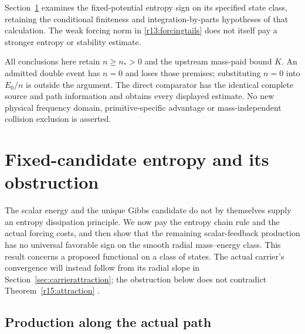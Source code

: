\documentclass[11pt]{article}
\numberwithin{equation}{section}
\begin{document}
Section~\ref{sec:entropyobstruction} examines the fixed-potential entropy
sign on its specified state class, retaining the conditional finiteness
and integration-by-parts hypotheses of that calculation. The weak
forcing norm in \eqref{r13:forcingtails} does not itself pay a stronger
entropy or stability estimate.

All conclusions here retain $n\ge n_*>0$ and the upstream mass-paid
bound $K$. An admitted double event has $n=0$ and loses those premises;
substituting $n=0$ into $E_0/n$ is outside the argument. The direct
comparator has the identical complete source and path information and
obtains every displayed estimate. No new physical frequency domain,
primitive-specific advantage or mass-independent collision exclusion
is asserted.

\section{Fixed-candidate entropy and its obstruction}
\label{sec:entropyobstruction}

The scalar energy and the unique Gibbs candidate do not by themselves
supply an entropy dissipation principle. We now pay the entropy chain
rule and the actual forcing costs, and then show that the remaining
scalar-feedback production has no universal favorable sign on the
smooth radial mass--energy class. This result concerns a proposed
functional on a class of states. The actual carrier's convergence will
instead follow from its radial slope in
Section~\ref{sec:carrierattraction}; the obstruction below does not
contradict Theorem~\ref{r15:attraction} \cite{EntropyObstructionNote}.

\subsection{Production along the actual path}
\end{document}
